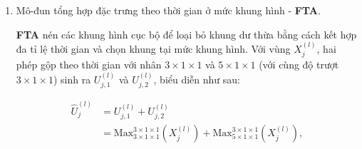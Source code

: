 \begin{enumerate}
          \textbf{ASTP} thực hiện ánh xạ đặc trưng phân cấp bằng cách áp dụng kĩ thuật gộp (\textbf{pooling}) không đều lên các vùng thu được từ $\mathcal{P}$. Với vùng $j$ của mức $l$, $X_j^{(l)}$, mô-đun \textbf{ASTP} tại mức $l$, $\Gamma^{(l)}$, được biểu diễn như sau:
          \begin{equation}
              Y_{\Gamma,j}^{(l)}=\Gamma_j^{(l)}(X_j^{(l)})=\text{GeM}_j \circ \text{FC} \circ \text{Max}(X_j^{(l)}),
          \end{equation}
          trong đó, $\text{Max}(\cdot)$ là phép gộp dựa trên giá trị lớn nhất () dọc theo trục thời gian, $\text{FC}(\cdot)$ là lớp kết nối đầy đủ, $\text{GeM}_j(\cdot)$ là phép gộp trung bình tổng quát (generalized mean pooling (GeM)) \cite{radenovic2018fine} cho vùng $j$. Chuỗi phép ánh xạ của $\Gamma_j$ như sau: $\Gamma_j:\mathbb{R}^{C \times T \times H_j^{(l)} \times W} \mapsto \mathbb{R}^{C \times 1 \times H_j^{(l)} \times W} \mapsto \mathbb{R}^{C^{(l)} \times 1 \times H_j^{(l)} \times W} \mapsto \mathbb{R}^{C^{(l)} \times 1 \times 1 \times 1}$. Nối các $Y_{\Gamma,j}^{(l)}$ theo thứ tự, thu được $Y_{\Gamma}^{(l)}=\left[Y_{\Gamma,1}^{(l)},Y_{\Gamma,2}^{(l)},\ldots,Y_{\Gamma,K_l}^{(l)}\right]$, với $Y_{\Gamma}^{(l)} \in \mathbb{R}^{C_{}^{(l)}\times 1 \times  K_l \times 1}$ là đầu ra của \textbf{ASTP} ở mức $l$.

    \item Mô-đun tổng hợp đặc trưng theo thời gian ở mức khung hình - \textbf{FTA}.

          \textbf{FTA} nén các khung hình cục bộ để loại bỏ khung dư thừa bằng cách kết hợp đa tỉ lệ thời gian và chọn khung tại mức khung hình. Với vùng $X_{j}^{(l)}$, hai phép gộp theo thời gian với nhân $3 \times 1 \times 1$ và $5 \times 1 \times 1$ (với cùng độ trượt $3 \times 1 \times 1$) sinh ra $U_{j,1}^{(l)}$ và $U_{j,2}^{(l)}$, biểu diễn như sau:

          \begin{equation}
              \begin{aligned}
                  \hat{U}_{j}^{(l)} & =U_{j,1}^{(l)}+U_{j,2}^{(l)} \\ &=\text{Max}_{3 \times 1 \times 1}^{3\times 1 \times 1}\left(X_{j}^{(l)}\right)
                  +\text{Max}_{5 \times 1 \times 1}^{3\times 1 \times 1}\left(X_{j}^{(l)}\right),
              \end{aligned}
              \label{equ:poolfeature}
          \end{equation}


\end{enumerate}

